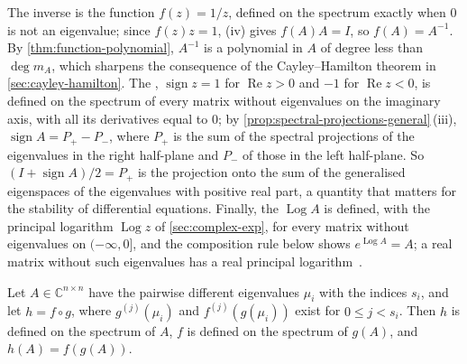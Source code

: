 The inverse is the function $f(z)=1/z$, defined on the spectrum exactly when $0$ is not an eigenvalue; since $f(z)z=1$, (iv) gives $f(A)A=I$, so $f(A)=A^{-1}$. By \cref{thm:function-polynomial}, $A^{-1}$ is a polynomial in $A$ of degree less than $\deg m_A$, which sharpens the consequence of the Cayley--Hamilton theorem in \cref{sec:cayley-hamilton}. The , $\operatorname{sign}z=1$ for $\operatorname{Re}z>0$ and $-1$ for $\operatorname{Re}z<0$, is defined on the spectrum of every matrix without eigenvalues on the imaginary axis, with all its derivatives equal to $0$; by \cref{prop:spectral-projections-general}\,(iii), $\operatorname{sign}A=P_+-P_-$, where $P_+$ is the sum of the spectral projections of the eigenvalues in the right half-plane and $P_-$ of those in the left half-plane. So $(I+\operatorname{sign}A)/2=P_+$ is the projection onto the sum of the generalised eigenspaces of the eigenvalues with positive real part, a quantity that matters for the stability of differential equations. Finally, the  $\operatorname{Log}A$ is defined, with the principal logarithm $\operatorname{Log}z$ of \cref{sec:complex-exp}, for every matrix without eigenvalues on $(-\infty,0]$, and the composition rule below shows $e^{\operatorname{Log}A}=A$; a real matrix without such eigenvalues has a real principal logarithm~\cite[Chap.~11]{higham2008}.

\begin{theorem}[Composition]
\label{thm:function-composition}
Let $A\in\mathbb C^{n\times n}$ have the pairwise different eigenvalues $\mu_i$ with the indices $s_i$, and let $h=f\circ g$, where $g^{(j)}(\mu_i)$ and $f^{(j)}(g(\mu_i))$ exist for $0\le j<s_i$. Then $h$ is defined on the spectrum of $A$, $f$ is defined on the spectrum of $g(A)$, and $h(A)=f(g(A))$.
\end{theorem}

